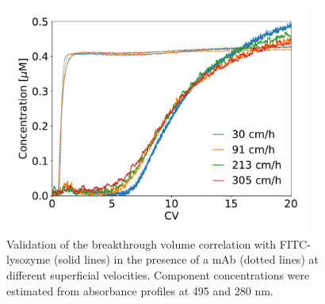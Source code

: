 \documentclass[11pt,a4paper]{article}
\providecommand{\DIFaddbeginFL}{} %
\providecommand{\DIFaddendFL}{} %
\providecommand{\DIFdelbeginFL}{} %
\providecommand{\DIFdelendFL}{} %
\begin{document}
\begin{figure}[bp]
    \centering
    \DIFdelbeginFL %
\DIFdelendFL \DIFaddbeginFL \includegraphics[width=0.9\textwidth]{figure_6}
    \DIFaddendFL \caption{Validation of the breakthrough volume correlation with FITC-lysozyme (solid lines) in the presence of a mAb (dotted lines) at different superficial velocities. Component concentrations were estimated from absorbance profiles at 495 and 280 nm.}
    \label{fig:validation with FITC lysozyme}
\end{figure}
\end{document}
